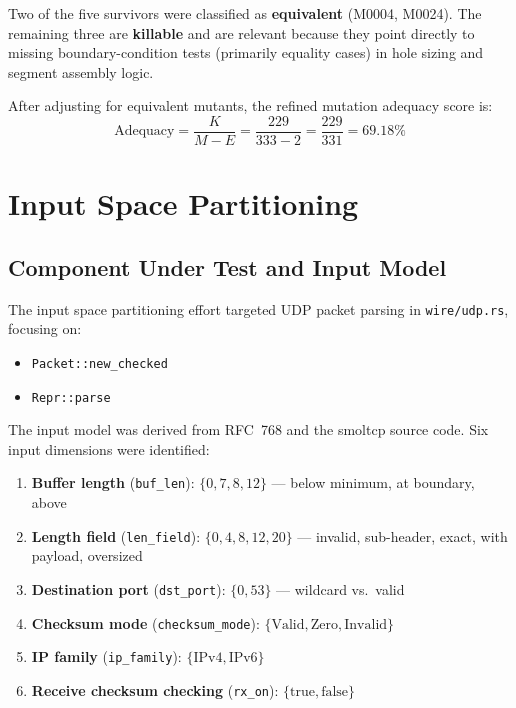 \documentclass[11pt,a4paper]{article}
\begin{document}
Two of the five survivors were classified as \textbf{equivalent} (M0004, M0024). The remaining three are \textbf{killable} and are relevant because they point directly to missing boundary-condition tests (primarily equality cases) in hole sizing and segment assembly logic.

After adjusting for equivalent mutants, the refined mutation adequacy score is:
\[
\text{Adequacy} = \frac{K}{M - E} = \frac{229}{333 - 2} = \frac{229}{331} = 69.18\%
\]

\section{Input Space Partitioning}

\subsection{Component Under Test and Input Model}

The input space partitioning effort targeted UDP packet parsing in \texttt{wire/udp.rs}, focusing on:

\begin{itemize}[noitemsep]
\item \texttt{Packet::new\_checked}
\item \texttt{Repr::parse}
\end{itemize}

The input model was derived from RFC~768 and the smoltcp source code. Six input dimensions were identified:

\begin{enumerate}[noitemsep]
\item \textbf{Buffer length} (\texttt{buf\_len}): $\{0, 7, 8, 12\}$ --- below minimum, at boundary, above
\item \textbf{Length field} (\texttt{len\_field}): $\{0, 4, 8, 12, 20\}$ --- invalid, sub-header, exact, with payload, oversized
\item \textbf{Destination port} (\texttt{dst\_port}): $\{0, 53\}$ --- wildcard vs.\ valid
\item \textbf{Checksum mode} (\texttt{checksum\_mode}): $\{\text{Valid}, \text{Zero}, \text{Invalid}\}$
\item \textbf{IP family} (\texttt{ip\_family}): $\{\text{IPv4}, \text{IPv6}\}$
\item \textbf{Receive checksum checking} (\texttt{rx\_on}): $\{\text{true}, \text{false}\}$
\end{enumerate}
\end{document}
